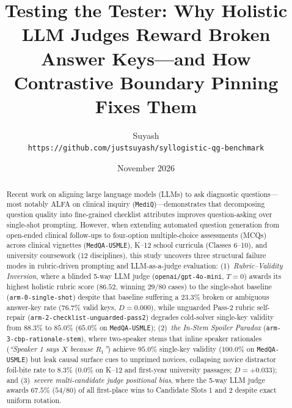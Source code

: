 \documentclass[11pt,a4paper]{article}
\title{\textbf{Testing the Tester: Why Holistic LLM Judges Reward Broken Answer Keys---and How Contrastive Boundary Pinning Fixes Them}}
\author{
  Suyash \\
  \texttt{https://github.com/justsuyash/syllogistic-qg-benchmark}
}
\date{November 2026}
\begin{document}
\maketitle

\begin{abstract}
Recent work on aligning large language models (LLMs) to ask diagnostic questions---most notably ALFA \cite{li2025alfa} on clinical inquiry (\texttt{MediQ})---demonstrates that decomposing question quality into fine-grained checklist attributes improves question-asking over single-shot prompting. However, when extending automated question generation from open-ended clinical follow-ups to four-option multiple-choice assessments (MCQs) across clinical vignettes (\texttt{MedQA-USMLE}), K--12 school curricula (Classes 6--10), and university coursework (12 disciplines), this study uncovers three structural failure modes in rubric-driven prompting and LLM-as-a-judge evaluation: (1)~\emph{Rubric--Validity Inversion}, where a blinded 5-way LLM judge (\texttt{openai/gpt-4o-mini}, $T=0$) awards its highest holistic rubric score ($86.52$, winning $29/80$ cases) to the single-shot baseline (\texttt{arm-0-single-shot}) despite that baseline suffering a $23.3\%$ broken or ambiguous answer-key rate ($76.7\%$ valid keys, $D = 0.000$), while unguarded Pass-2 rubric self-repair (\texttt{arm-2-checklist-unguarded-pass2}) degrades cold-solver single-key validity from $88.3\%$ to $85.0\%$ ($65.0\%$ on \texttt{MedQA-USMLE}); (2)~\emph{the In-Stem Spoiler Paradox} (\texttt{arm-3-cbp-rationale-stem}), where two-speaker stems that inline speaker rationales (\emph{``Speaker 1 says $X$ because $R_1$''}) achieve $95.0\%$ single-key validity ($100.0\%$ on \texttt{MedQA-USMLE}) but leak causal surface cues to unprimed novices, collapsing novice distractor foil-bite rate to $8.3\%$ ($0.0\%$ on K--12 and first-year university passages; $D = +0.033$); and (3)~\emph{severe multi-candidate judge positional bias}, where the 5-way LLM judge awards $67.5\%$ ($54/80$) of all first-place wins to Candidate Slots 1 and 2 despite exact uniform rotation.


\end{abstract}
\end{document}
